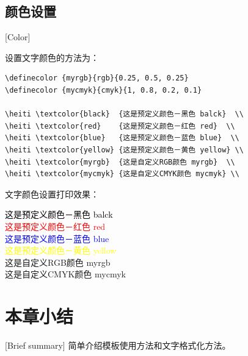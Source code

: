 \subsection{颜色设置}[Color]

设置文字颜色的方法为：
\begin{lstlisting}
\definecolor {myrgb}{rgb}{0.25, 0.5, 0.25}
\definecolor {mycmyk}{cmyk}{1, 0.8, 0.2, 0.1}

\heiti \textcolor{black}  {这是预定义颜色－黑色 balck}  \\
\heiti \textcolor{red}    {这是预定义颜色－红色 red}  \\
\heiti \textcolor{blue}   {这是预定义颜色－蓝色 blue}  \\
\heiti \textcolor{yellow} {这是预定义颜色－黄色 yellow} \\
\heiti \textcolor{myrgb}  {这是自定义RGB颜色 myrgb}  \\
\heiti \textcolor{mycmyk} {这是自定义CMYK颜色 mycmyk} \\
\end{lstlisting}


文字颜色设置打印效果：
\begin{flushleft}
  \xiaosan
  {

    \heiti \textcolor{black}  {这是预定义颜色－黑色 balck}  \\
    \heiti \textcolor{red}    {这是预定义颜色－红色 red}  \\
    \heiti \textcolor{blue}   {这是预定义颜色－蓝色 blue}  \\
    \heiti \textcolor{yellow} {这是预定义颜色－黄色 yellow} \\
    \heiti \textcolor{myrgb}  {这是自定义RGB颜色 myrgb}  \\
    \heiti \textcolor{mycmyk} {这是自定义CMYK颜色 mycmyk} \\
  }
\end{flushleft}

\section{本章小结}[Brief summary]
简单介绍模板使用方法和文字格式化方法。
